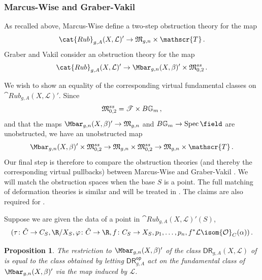 \documentclass[a4paper,12pt]{article} %
\newcommand{\on}[1]{\operatorname{#1}}
\newcommand{\bb}[1]{{\mathbb{#1}}}
\newcommand{\cl}[1]{{\mathscr{#1}}}
\newcommand{\ca}[1]{{\mathcal{#1}}}
\def\DR{\mathsf{DR}}
\theoremstyle{definition}
\theoremstyle{plain}%
\newtheorem{proposition}[definition]{Proposition}
\newcommand{\MbarX}{\Mbar_{g,n}(X, \beta)}
\renewcommand{\phi}{\varphi}
\newcommand{\DRop}{\mathsf{DR}^{\mathsf{op}}}
\begin{document}
\subsubsection{Marcus-Wise and Graber-Vakil}\label{mwgv}


As recalled above, Marcus-Wise define a two-step obstruction theory for the map 
\begin{equation*}
\cat{Rub}_{g,A}(X, \ca L)' \to \frak M_{g,n} \times \cl T\,. 
\end{equation*}
Graber and Vakil consider an obstruction theory for the map 
\begin{equation} \label{vrrt}
\cat{Rub}_{g,A}(X, \ca L)' \to \MbarX' \times \frak M_{0,2}^{ss}\, .
\end{equation}

We wish to show an equality of the corresponding virtual fundamental classes on $\cat{Rub}_{g,A}(X, \ca L)'$. Since $$\frak M_{0,2}^{ss} = \cl T \times B\bb G_m\, ,$$ and that the maps $\MbarX' \to \frak M_{g,n}$ and $B \bb G_m \to \on{Spec} \field$ are unobstructed, we have an unobstructed map
$$ \MbarX' \times \frak M_{0,2}^{ss} \to \frak M_{g,n} \times \frak M_{0,2}^{ss} \to \frak M_{g,n} \times \cl T\, .$$
Our final step is therefore to compare the obstruction theories (and thereby the corresponding virtual pullbacks) between Marcus-Wise and Graber-Vakil \cite{Graber2005Relative-virtua,Li2002A-degeneration-}.
We will match the obstruction spaces when the base $S$ is a point.
The full matching of deformation theories is similar and will be treated in \cite{PW}.
The claims are also required for \cite{Marcus2017Logarithmic-com}.

Suppose we are given the data of a point in $\cat{Rub}_{g,A}(X, \ca L)'(S)$,
\begin{equation}
(\tau\colon \tilde C \to C_S, \R/X_S, \phi\colon \tilde C \to \R, f\colon C_S \to X_S, p_1, \dots, p_n, f^*\ca L \isom \ca O_C(\alpha))\, .
\end{equation}

\begin{proposition}\label{prop:vfc_comparison_summary}
The restriction to $\MbarX'$ of the class $\DR_{g,A}(X, \ca L)$ of \cite{Janda2018Double-ramifica} is equal to the class obtained by letting $\DRop_{g,A}$ act on the fundamental class of $\MbarX'$ via the map induced by $\ca L$. 
\end{proposition}
\end{document}

